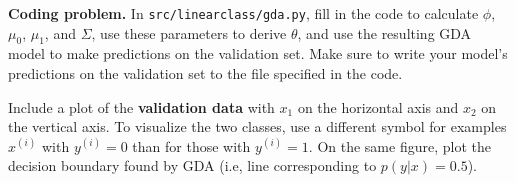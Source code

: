 \item {} \textbf{Coding problem.}
In \texttt{src/linearclass/gda.py}, fill in the code to
calculate $\phi$, $\mu_{0}$, $\mu_{1}$, and $\Sigma$, use these parameters
to derive $\theta$, and use the resulting GDA model to make predictions on the
validation set. Make sure to write your model's predictions on
the validation set to the file specified in the code.

Include a plot of the \textbf{validation data} with $x_1$ on the horizontal axis and $x_2$ on the vertical axis.
To visualize the two classes, use a different symbol for examples $x^{(i)}$
with $y^{(i)} = 0$ than for those with $y^{(i)} = 1$. On the same figure, plot the decision boundary
found by GDA (i.e, line corresponding to $p(y|x) = 0.5$).

